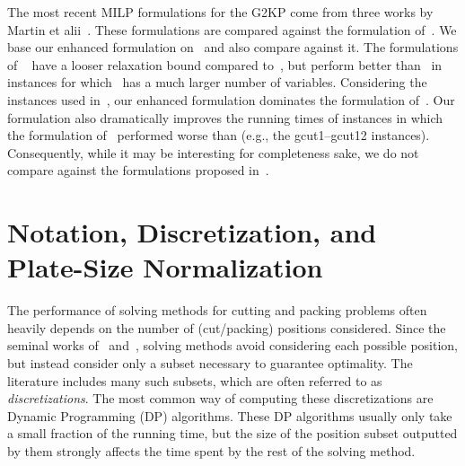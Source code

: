 \documentclass[smallextended]{svjour3}       %
\begin{document}
The most recent MILP formulations for the G2KP come from three works by Martin et alii~\cite{martin:2020:models,martin:2020:bottom,martin:2020:top}.
These formulations are compared against the formulation of~\cite{furini:2016}.
We base our enhanced formulation on~\cite{furini:2016} and also compare against it.
The formulations of ~\cite{martin:2020:models,martin:2020:bottom,martin:2020:top}
have a looser relaxation bound compared to~\cite{furini:2016}, but perform better than~\cite{furini:2016} in instances for which~\cite{furini:2016} has a much larger number of variables.
Considering the instances used in~\cite{furini:2016}, our enhanced formulation dominates the formulation of~\cite{furini:2016}.
Our formulation also dramatically improves the running times of instances in which the formulation of~\cite{furini:2016} performed worse than \cite{martin:2020:models,martin:2020:bottom,martin:2020:top} (e.g., the gcut1--gcut12 instances).
Consequently, while it may be interesting for completeness sake, we do not compare against the formulations proposed in~\cite{martin:2020:models,martin:2020:bottom,martin:2020:top}.


\section{Notation, Discretization, and Plate-Size Normalization}
\label{sec:psn}

The performance of solving methods for cutting and packing problems often heavily depends on the number of (cut/packing) positions considered.
Since the seminal works of~\cite{nicos:1977} and~\cite{herz:1972}, solving methods avoid considering each possible position, but instead consider only a subset necessary to guarantee optimality.
The literature includes many such subsets, which are often referred to as \emph{discretizations}.
The most common way of computing these discretizations are Dynamic Programming (DP) algorithms.
These DP algorithms usually only take a small fraction of the running time, but the size of the position subset outputted by them strongly affects the time spent by the rest of the solving method.
\end{document}
